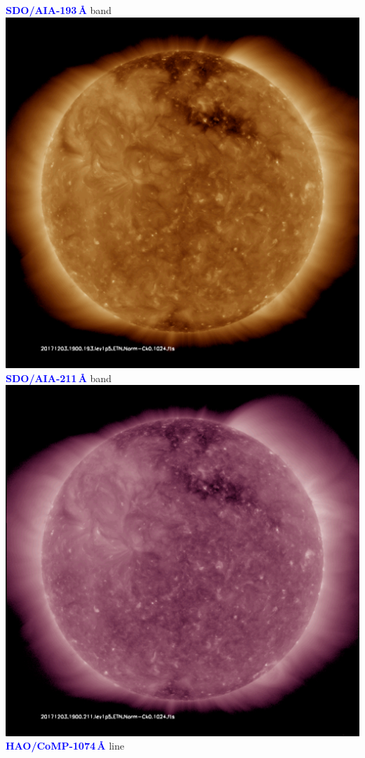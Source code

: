 \documentclass[a0,portrait,final]{baposter_old}
\def\azul#1{\textcolor{blue}{\bf\sf #1}}
\begin{document}
\begin{poster}
{{\begin{center}
\azul{SDO/AIA-193\,\AA} band\\
\includegraphics[width=0.9\columnwidth]{img_193.pdf}\\
\azul{SDO/AIA-211\,\AA} band\\
\includegraphics[width=0.9\columnwidth]{img_211.pdf}\\
\azul{HAO/CoMP-1074\,\AA} line\\

\end{center}}}
\end{poster}
\end{document}

